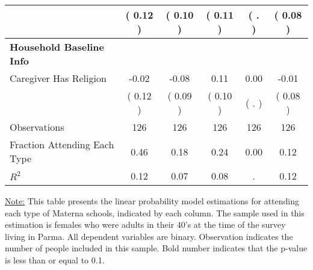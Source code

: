 \begin{table}[H]
{\begin{tabular}{lccccc}
\quad  & (     0.12 ) & (     0.10 )  & (     0.11 )  & (        . ) & (     0.08 ) \\
\midrule
\textbf{Household Baseline Info} \\
\quad Caregiver Has Religion &     -0.02 &     -0.08 &      0.11 &      0.00 &     -0.01 \\
\quad  & (     0.12 ) & (     0.09 )  & (     0.10 )  & (        . ) & (     0.08 ) \\
\midrule
Observations & 126 & 126 & 126 & 126 & 126 \\
Fraction Attending Each Type &      0.46 &      0.18 &      0.24 &      0.00 &      0.12 \\
\midrule
$ R^2$ &      0.12 &      0.07 &      0.08 &         . &      0.12 \\
\bottomrule
\end{tabular}}
\end{table}
\begin{footnotesize}
\noindent\underline{Note:} This table presents the linear probability model estimations for attending each type of Materna schools, indicated by each column. The sample used in this estimation is females who were adults in their 40's at the time of the survey living in Parma. All dependent variables are binary. Observation indicates the number of people included in this sample. Bold number indicates that the p-value is less than or equal to 0.1.
\end{footnotesize}
